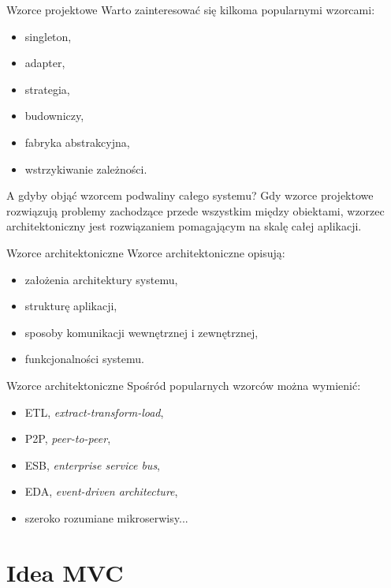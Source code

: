 \begin{frame}{Wzorce projektowe}
	Warto zainteresować się kilkoma popularnymi wzorcami:
	\begin{itemize}
		\item singleton,
		\item adapter,
		\item strategia,
		\item budowniczy,
		\item fabryka abstrakcyjna,
		\item wstrzykiwanie zależności.
	\end{itemize}
\end{frame}

\begin{frame}{A gdyby objąć wzorcem podwaliny całego systemu?}
	Gdy wzorce projektowe rozwiązują problemy zachodzące przede wszystkim między obiektami, wzorzec architektoniczny jest rozwiązaniem pomagającym na skalę całej aplikacji.
\end{frame}

\begin{frame}{Wzorce architektoniczne}
	Wzorce architektoniczne opisują:
	\begin{itemize}
		\item założenia architektury systemu,
		\item strukturę aplikacji,
		\item sposoby komunikacji wewnętrznej i zewnętrznej,
		\item funkcjonalności systemu.
	\end{itemize}
\end{frame}

\begin{frame}{Wzorce architektoniczne}
	Spośród popularnych wzorców można wymienić:
	\begin{itemize}
		\item ETL, \emph{extract-transform-load},
		\item P2P, \emph{peer-to-peer},
		\item ESB, \emph{enterprise service bus},
		\item EDA, \emph{event-driven architecture},
		\item szeroko rozumiane mikroserwisy...
	\end{itemize}
\end{frame}

\section{Idea MVC}


